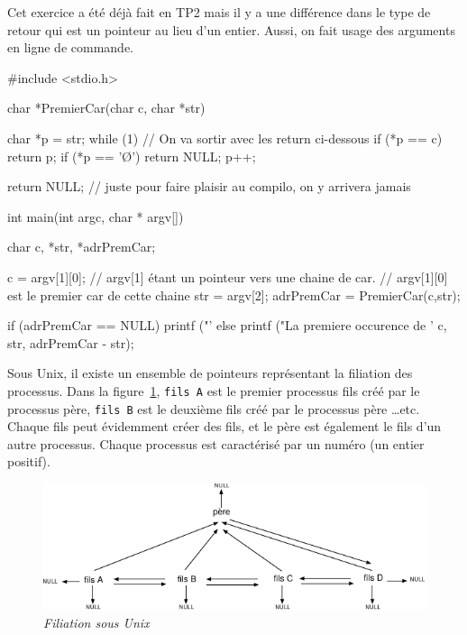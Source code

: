 \documentclass[10pt]{article}\usepackage[nu,correction]{esial}
\begin{document}
\begin{Reponse}
  Cet exercice a été déjà fait en TP2 mais il y a une différence dans
  le type de retour qui est un pointeur au lieu d'un entier. Aussi, on
  fait usage des arguments en ligne de commande.

\begin{boxedverbatim}
#include <stdio.h>

char *PremierCar(char c, char *str){
  char *p = str;
  while (1) { // On va sortir avec les return ci-dessous
    if (*p == c)
      return p;
    if (*p == '\O')
      return NULL;
    p++;
  }

  return NULL; // juste pour faire plaisir au compilo, on y arrivera jamais
}

int main(int argc, char * argv[]){

  char c, *str, *adrPremCar;

  c = argv[1][0]; // argv[1] étant un pointeur vers une chaine de car.
                  // argv[1][0] est le premier car de cette chaine
  str = argv[2];
  adrPremCar = PremierCar(c,str);

  if (adrPremCar == NULL) 
    printf ("'%
  else
    printf ("La premiere occurence de '%
            c, str, adrPremCar - str);
}
\end{boxedverbatim}
\end{Reponse}
    



\bigskip\bigskip{}

Sous Unix, il existe un ensemble de pointeurs représentant la
filiation des  processus. 
%
Dans la figure~\ref{filiation}, {\tt fils A} est le premier processus
fils créé par le processus père, {\tt fils B} est le deuxième fils
créé par le processus père \ldots etc.
Chaque fils peut évidemment créer des fils, et le père est également le
fils d'un autre processus.
%
Chaque processus est caractérisé par un numéro (un entier positif).

\bigskip\bigskip
\begin{figure}[h]
  \centerline{\includegraphics[width=\linewidth]{filiation.pdf}}
  \caption[]
	  {{\it Filiation sous Unix}}
	  \label{filiation}
\end{figure}
\bigskip
\end{document}

